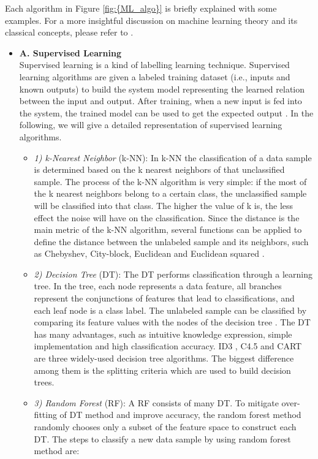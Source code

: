 Each algorithm in Figure \ref{fig:{ML_algo}} is briefly explained with some examples. For a more insightful discussion on machine learning theory and its classical concepts, please refer to \cite{Mohammed2016, Marsland2015, Alpaydin2020}.
\begin{itemize}
\item[]\textbf{A. Supervised Learning}\\
Supervised learning is a kind of labelling learning technique. Supervised learning algorithms are given a labeled training dataset (i.e., inputs and known outputs) to build the system model representing the learned relation between the input and output. After training, when a new input is fed into the system, the trained model can be used to get the expected output \cite{Kotsiantis2007, Hastie2009}. In the following, we will give a detailed representation of supervised learning algorithms.
\begin{itemize}
\item[]\textit{1) k-Nearest Neighbor} (k-NN): In k-NN the classification of a data sample is determined based on the k nearest neighbors of that unclassified sample. The process of the k-NN algorithm is very simple: if the most of the k nearest neighbors belong to a certain class, the unclassified sample will be classified into that class. The higher the value of k is, the less effect the noise will have on the classification. Since the distance is the main metric of the k-NN algorithm, several functions can be applied to define the distance between the unlabeled sample and its neighbors, such as Chebyshev, City-block, Euclidean and Euclidean squared \cite{Cover1967}.
\item[]\textit{2) Decision Tree} (DT): The DT performs classification through a learning tree. In the tree, each node represents a data feature, all branches represent the conjunctions of features that lead to classifications, and each leaf node is a class label. The unlabeled sample can be classified by comparing its feature values with the nodes of the decision tree \cite{Han2011}. The DT has many advantages, such as intuitive knowledge expression, simple implementation and high classification accuracy. ID3 \cite{Quinlan1986}, C4.5 \cite{Karatsiolis2012} and CART \cite{Burrows1995} are three widely-used decision tree algorithms. The biggest difference among them is the splitting criteria which are used to build decision trees. 
\item[]\textit{3) Random Forest} (RF): A RF \cite{Breiman1999} consists of many DT. To mitigate over-fitting of DT method and improve accuracy, the random forest method randomly chooses only a subset of the feature space to construct each DT. The steps to classify a new data sample by using random forest method are:

\end{itemize}
\end{itemize}
